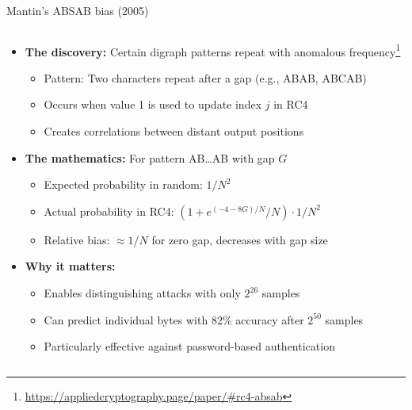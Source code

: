 \documentclass[aspectratio=169, lualatex, handout]{beamer}
\begin{document}
\begin{frame}{Mantin's ABSAB bias (2005)}
	\begin{columns}[c]
		\begin{column}{1\textwidth}
			\begin{itemize}
				\item \textbf{The discovery:} Certain digraph patterns repeat with anomalous frequency\footnote{\url{https://appliedcryptography.page/paper/\#rc4-absab}}
				      \begin{itemize}
					      \item Pattern: Two characters repeat after a gap (e.g., ABAB, ABCAB)
					      \item Occurs when value 1 is used to update index $j$ in RC4
					      \item Creates correlations between distant output positions
				      \end{itemize}
				\item \textbf{The mathematics:} For pattern AB\ldots AB with gap $G$
				      \begin{itemize}
					      \item Expected probability in random: $1/N^2$
					      \item Actual probability in RC4: $(1 + e^{(-4-8G)/N}/N) \cdot 1/N^2$
					      \item Relative bias: $\approx 1/N$ for zero gap, decreases with gap size
				      \end{itemize}
				\item \textbf{Why it matters:}
				      \begin{itemize}
					      \item Enables distinguishing attacks with only $2^{26}$ samples
					      \item Can predict individual bytes with 82\% accuracy after $2^{50}$ samples
					      \item Particularly effective against password-based authentication
				      \end{itemize}
			\end{itemize}
		\end{column}
	\end{columns}
\end{frame}
\end{document}
